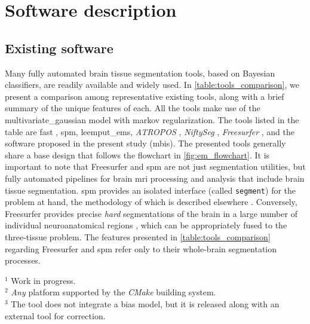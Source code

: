 \section{Software description}\label{sec:software}

\subsection{Existing software}
\label{sec:related_work}

Many fully automated brain tissue segmentation tools, based on 
  Bayesian classifiers, are readily available and widely used.
In \autoref{table:tools_comparison}, we present a comparison among
  representative existing tools, along with a brief summary of the
  unique features of each.
All the tools make use of the \gls*{multivariate_gaussian} model
  with \gls*{markov} regularization.
The tools listed in the table are \gls*{fast} \citep{zhang_segmentation_2001}, 
  \gls*{spm}, \gls*{leemput_ems}, \emph{ATROPOS} \citep{avants_open_2011},
  \emph{NiftySeg} \citep{cardoso_niftyseg:_2012}, \emph{Freesurfer} 
  \citep{fischl_freesurfer_2012},
  and the software proposed in the present study (\gls*{mbis}).
The presented tools generally share a base design that follows
  the flowchart in \autoref{fig:em_flowchart}.
It is important to note that Freesurfer and \gls*{spm} are not just
  segmentation utilities, but fully automated pipelines for brain
  \gls*{mri} processing and analysis that include brain tissue segmentation.
\Gls*{spm} provides an isolated interface (called \texttt{segment}) for the
  problem at hand, the methodology of which is described elsewhere
  \citep{ashburner_unified_2005}.
Conversely, Freesurfer provides precise \emph{hard} segmentations of the brain
  in a large number of individual neuroanatomical regions \citep{fischl_whole_2002},
  which can be appropriately fused to the three-tissue problem.
The features presented in \autoref{table:tools_comparison} regarding Freesurfer
  and \gls*{spm} refer only to their whole-brain segmentation processes.

\begin{table*}[!t]
\begin{minipage}[t]{\linewidth}
\caption[Brain tissue segmentation tools]{\label{table:tools_comparison}}
\footnotesize

\footnotesize
$^{1}$ Work in progress. \\
$^{2}$ \emph{Any} platform supported by the \emph{CMake} building system.\\
$^{3}$ The tool does not integrate a bias model, but it is released along with an external tool for correction.\\
\end{minipage}
\end{table*}

